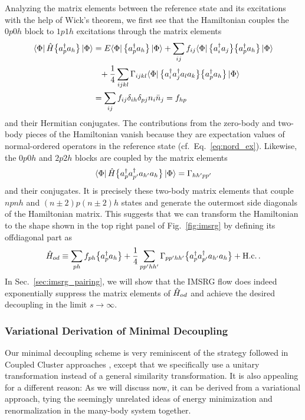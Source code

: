 {Analyzing the matrix elements between the reference state and its
excitations with the help of Wick's theorem, we first see that the 
Hamiltonian couples the $0p0h$ block to $1p1h$ excitations through 
the matrix elements
\begin{align}
\matrixe{\Phi}{\HO\nord{\aaO_{p}\aO_{h}}}{\Phi}
  &=E\matrixe{\Phi}{\nord{\aaO_{p}\aO_{h}}}{\Phi}
    +\sum_{ij}f_{ij}\matrixe{\Phi}{\nord{\aaO_{i}\aO_{j}}\nord{\aaO_{p}\aO_{h}}}{\Phi}\notag\\
  &\hphantom{=}+\frac{1}{4}\sum_{ijkl}\Gamma_{ijkl}
      \matrixe{\Phi}{\nord{\aaO_{i}\aaO_{j}\aO_{l}\aO_{k}}\nord{\aaO_{p}\aO_{h}}}{\Phi}\notag\\
  &=\sum_{ij}f_{ij}\delta_{ih}\delta_{pj}n_i\nn_j = f_{hp} \label{eq:coupl_1p1h}
\end{align}
and their Hermitian conjugates. The contributions from the zero-body and 
two-body pieces of the Hamiltonian vanish because they are expectation
values of normal-ordered operators in the reference state (cf.~Eq.~\eqref{eq:nord_ex}).
Likewise, the $0p0h$ and $2p2h$ blocks are coupled by the matrix elements
\begin{equation}
\langle{\Phi}|\,{\hat{H}\big\{a^\dag_{p}a^\dag_{p'}a_{h'}a_{h}\big\}}\,|{\Phi}\rangle = \Gamma_{hh'pp'}
\end{equation}
and their conjugates. It is precisely these two-body matrix elements 
that couple $npnh$ and $(n\pm2)p(n\pm2)h$ states and generate the
outermost side diagonals of the Hamiltonian matrix. This suggests that 
we can transform the Hamiltonian to the shape shown in the top right panel
of Fig.~\ref{fig:imsrg} by defining its offdiagonal part as
\begin{equation}
  \hat{H}_{od} \equiv \sum_{ph}f_{ph}\big\{a^\dag_{p}a_{h}\big\} + 
              \frac{1}{4}\sum_{pp'hh'}\Gamma_{pp'hh'}\big\{a^\dag_{p}a^\dag_{p'}a_{h'}a_{h}\big\} + \text{H.c.}\,.
\end{equation}
In Sec.~\ref{sec:imsrg_pairing}, we will show that the IMSRG flow does indeed
exponentially suppress the matrix elements of $\hat{H}_{od}$ and 
achieve the desired decoupling in the limit $s\to\infty$. 

%
%
\subsubsection{\label{sec:imsrg_variational}Variational Derivation of Minimal Decoupling}
Our minimal decoupling scheme is very reminiscent of the strategy 
followed in Coupled Cluster approaches \cite{Shavitt:2009,Hagen:2014ve}, except 
that we specifically use a unitary transformation instead of a general 
similarity transformation. It is also appealing for a different reason: As 
we will discuss now, it can be derived from a variational approach, tying
the seemingly unrelated ideas of energy minimization and renormalization 
in the many-body system together. 

}
